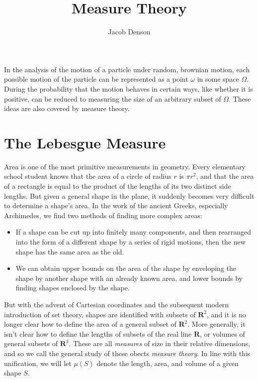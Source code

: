 

\title{Measure Theory}
\author{Jacob Denson}




\maketitle

\tableofcontents


In the analysis of the motion of a particle under random, brownian motion, each possible motion of the particle can be represented as a point $\omega$ in some space $\Omega$. During the probability that the motion behaves in certain ways, like whether it is positive, can be reduced to measuring the size of an arbitrary subset of $\Omega$. These ideas are also covered by measure theory.

\chapter{The Lebesgue Measure}

Area is one of the most primitive measurements in geometry. Every elementary school student knows that the area of a circle of radius $r$ is $\pi r^2$, and that the area of a rectangle is equal to the product of the lengths of its two distinct side lengths. But given a general shape in the plane, it suddenly becomes very difficult to determine a shape's area. In the work of the ancient Greeks, especially Archimedes, we find two methods of finding more complex areas:
%
\begin{itemize}
    \item If a shape can be cut up into finitely many components, and then rearranged into the form of a different shape by a series of rigid motions, then the new shape has the same area as the old.

    \item We can obtain upper bounds on the area of the shape by enveloping the shape by another shape with an already known area, and lower bounds by finding shapes enclosed by the shape.
\end{itemize}
%
But with the advent of Cartesian coordinates and the subsequent modern introduction of set theory, shapes are identified with subsets of $\mathbf{R}^2$, and it is no longer clear how to define the area of a general subset of $\mathbf{R}^2$. More generally, it isn't clear how to define the lengths of subsets of the real line $\mathbf{R}$, or volumes of general subsets of $\mathbf{R}^3$. These are all {\it measures} of size in their relative dimensions, and so we call the general study of these obects {\it measure theory}. In line with this unification, we will let $\mu(S)$ denote the length, area, and volume of a given shape $S$.

